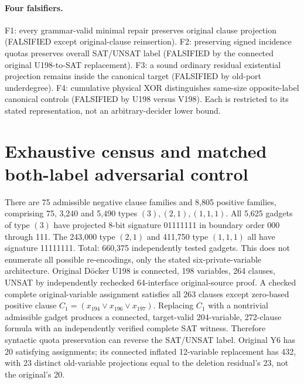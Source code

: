 \documentclass[11pt]{article}
\begin{document}
\paragraph{Four falsifiers.} F1: every grammar-valid minimal repair preserves original clause projection (FALSIFIED except original-clause reinsertion). F2: preserving signed incidence quotas preserves overall SAT/UNSAT label (FALSIFIED by the connected original U198-to-SAT replacement). F3: a sound ordinary residual existential projection remains inside the canonical target (FALSIFIED by old-port underdegree). F4: cumulative physical XOR distinguishes same-size opposite-label canonical controls (FALSIFIED by U198 versus V198). Each is restricted to its stated representation, not an arbitrary-decider lower bound.
\section{Exhaustive census and matched both-label adversarial control}
There are 75 admissible negative clause families and 8,805 positive families, comprising 75, 3,240 and 5,490 types $(3),(2,1),(1,1,1)$. All 5,625 gadgets of type $(3)$ have projected 8-bit signature 01111111 in boundary order 000 through 111. The 243,000 type $(2,1)$ and 411,750 type $(1,1,1)$ all have signature 11111111. Total: 660,375 independently tested gadgets. This does not enumerate all possible re-encodings, only the stated six-private-variable architecture.
Original D\"ocker U198 is connected, 198 variables, 264 clauses, UNSAT by independently rechecked 64-interface original-source proof. A checked complete original-variable assignment satisfies all 263 clauses except zero-based positive clause $C_1=(x_{194}\vee x_{196}\vee x_{197})$. Replacing $C_1$ with a nontrivial admissible gadget produces a connected, target-valid 204-variable, 272-clause formula with an independently verified complete SAT witness. Therefore syntactic quota preservation can reverse the SAT/UNSAT label. Original Y6 has 20 satisfying assignments; its connected inflated 12-variable replacement has 432, with 23 distinct old-variable projections equal to the deletion residual's 23, not the original's 20.
\end{document}
